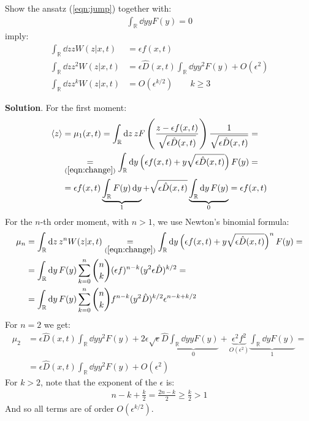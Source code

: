 \documentclass[../template.tex]{subfiles}
\begin{document}
\begin{exo}
    Show the ansatz (\ref{eqn:jump}) together with:
    \begin{align*}
        \int_{\mathbb{R}} \dd{y} y F(y) = 0
    \end{align*} 
    imply:
    \begin{align*}
        \int_{\mathbb{R}} \dd{z} z W(z|x,t) &= \epsilon f(x,t)\\
        \int_{\mathbb{R}} \dd{z} z^2 W(z|x,t) &= \epsilon \hat{D}(x,t) \int_{\mathbb{R}} \dd{y} y^2 F(y) + O(\epsilon^2)\\
        \int_{\mathbb{R}} \dd{z} z^k W(z|x,t) &= O(\epsilon^{k/2}) \qquad k\geq 3
    \end{align*}

    \medskip

    \textbf{Solution}. For the first moment:
    \begin{align*}
        \langle z \rangle &= \mu_1(x,t) = \int_{\mathbb{R}} \dd{z} z F\left(\frac{z - \epsilon f(x,t)}{\sqrt{\epsilon \hat{D}(x,t)}} \right) \frac{1}{\sqrt{\epsilon \hat{D}(x,t)}}  =\\
        &\underset{(\ref{eqn:change})}{=} \int_{\mathbb{R}} \dd{y} \left(\epsilon f(x,t) + y \sqrt{\epsilon \hat{D}(x,t)}\right) F(y) =\\
        &= \epsilon f(x,t) \underbrace{\int_{\mathbb{R}} F(y) \dd{y} }_{1}+ \sqrt{\epsilon \hat{D}(x,t)} \underbrace{\int_{\mathbb{R}} \dd{y} F(y)}_{0} = \epsilon f(x,t)
    \end{align*} 
    For the $n$-th order moment, with $n>1$, we use Newton's binomial formula:
    \begin{align*}
        \mu_n &= \int_{\mathbb{R}} \dd{z} z^n W(z|x,t) \underset{(\ref{eqn:change})}{=} \int_{\mathbb{R}} \dd{y} \left(\epsilon f(x,t) + y \sqrt{\epsilon \hat{D}(x,t)}\right)^n F(y) =\\
        &= \int_{\mathbb{R}} \dd{y} F(y) \sum_{k=0}^n {n \choose k} (\epsilon f)^{n-k} (y^2 \epsilon \hat{D})^{k/2} =\\
        &= \int_{\mathbb{R}} \dd{y} F(y) \sum_{k=0}^{n} {n\choose k} f^{n-k} (y^2 \hat{D})^{k/2} \epsilon^{n-k+k/2}
    \end{align*}
    For $n=2$ we get:
    \begin{align*}
        \mu_2 &= \epsilon \hat{D}(x,t) \int_{\mathbb{R}} \dd{y} y^2 F(y) + 2 \epsilon \sqrt{\epsilon} \hat{D} \underbrace{\int_{\mathbb{R}} \dd{y} y F(y)}_{0} +\underbrace{ \epsilon^2 f^2}_{ O(\epsilon^2)}\underbrace{ \int_{\mathbb{R}} \dd{y} F(y)}_{1} =\\
        &= \epsilon \hat{D}(x,t) \int_{\mathbb{R}} \dd{y} y^2 F(y) + O(\epsilon^2)
    \end{align*}
    For $k > 2$, note that the exponent of the $\epsilon$ is:
    \begin{align*}
        n - k + \frac{k}{2} = \frac{2n-k}{2} \geq \frac{k}{2} > 1   
    \end{align*}
    And so all terms are of order $O(\epsilon^{k/2})$.
\end{exo}
\end{document}
